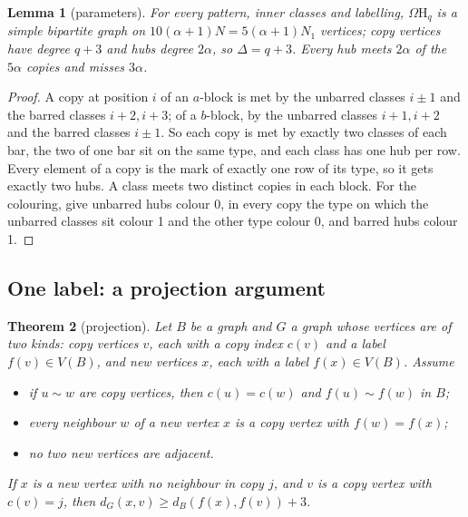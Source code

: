\documentclass[11pt]{amsart}
\newtheorem{theorem}{Theorem}[section]
\newtheorem{lemma}[theorem]{Lemma}
\theoremstyle{definition}
\theoremstyle{remark}
\numberwithin{equation}{section}
\newcommand{\Om}{\Omega\mathrm H}
\begin{document}
\begin{lemma}[parameters]\label{lem:omegaparams}
For every pattern, inner classes and labelling, $\Om_q$ is a simple bipartite graph on $10(\alpha+1)N=5(\alpha+1)N_1$
vertices; copy vertices have degree $q+3$ and hubs degree $2\alpha$, so $\Delta=q+3$. Every hub meets $2\alpha$ of the
$5\alpha$ copies and misses $3\alpha$.
\end{lemma}

\begin{proof}
A copy at position $i$ of an $a$-block is met by the unbarred classes $i\pm1$ and the barred classes $i+2,i+3$; of a
$b$-block, by the unbarred classes $i+1,i+2$ and the barred classes $i\pm1$. So each copy is met by exactly two classes of
each bar, the two of one bar sit on the same type, and each class has one hub per row. Every element of a copy is the mark
of exactly one row of its type, so it gets exactly two hubs. A class meets two distinct copies in each block. For the
colouring, give unbarred hubs colour 0, in every copy the type on which the unbarred classes sit colour 1 and the other type
colour 0, and barred hubs colour 1.
\end{proof}

\subsection{One label: a projection argument}

\begin{theorem}[projection]\label{thm:proj}
Let $B$ be a graph and $G$ a graph whose vertices are of two kinds: \emph{copy vertices} $v$, each with a copy index $c(v)$
and a label $f(v)\in V(B)$, and \emph{new vertices} $x$, each with a label $f(x)\in V(B)$. Assume
\begin{itemize}
\item[(h1)] if $u\sim w$ are copy vertices, then $c(u)=c(w)$ and $f(u)\sim f(w)$ in $B$;
\item[(h2)] every neighbour $w$ of a new vertex $x$ is a copy vertex with $f(w)=f(x)$;
\item[(h3)] no two new vertices are adjacent.
\end{itemize}
If $x$ is a new vertex with no neighbour in copy $j$, and $v$ is a copy vertex with $c(v)=j$, then
$d_G(x,v)\ge d_B(f(x),f(v))+3$.
\end{theorem}
\end{document}
